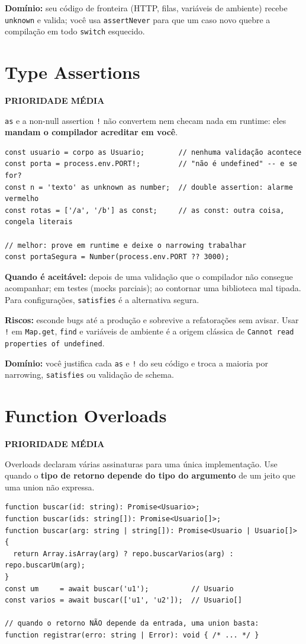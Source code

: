 \documentclass[12pt,a4paper,oneside]{book}
\newcommand{\media}{\colorbox{orange!20}{\sffamily\scriptsize\bfseries PRIORIDADE MÉDIA}}
\newcommand{\code}[1]{\texttt{#1}}
\newcommand{\dom}[1]{\begin{dominio}\textbf{Domínio:} #1\end{dominio}}
\begin{document}
\dom{seu código de fronteira (HTTP, filas, variáveis de ambiente) recebe \code{unknown} e valida; você usa \code{assertNever} para que um caso novo quebre a compilação em todo \code{switch} esquecido.}

\section{Type Assertions}
\label{sec:assertions}
\media

\code{as} e a non-null assertion \code{!} não convertem nem checam nada em runtime: eles \textbf{mandam o compilador acreditar em você}.

\begin{verbatim}
const usuario = corpo as Usuario;        // nenhuma validação acontece
const porta = process.env.PORT!;         // "não é undefined" -- e se for?
const n = 'texto' as unknown as number;  // double assertion: alarme vermelho
const rotas = ['/a', '/b'] as const;     // as const: outra coisa, congela literais

// melhor: prove em runtime e deixe o narrowing trabalhar
const portaSegura = Number(process.env.PORT ?? 3000);
\end{verbatim}

\textbf{Quando é aceitável:} depois de uma validação que o compilador não consegue acompanhar; em testes (mocks parciais); ao contornar uma biblioteca mal tipada. Para configurações, \code{satisfies} é a alternativa segura.

\textbf{Riscos:} esconde bugs até a produção e sobrevive a refatorações sem avisar. Usar \code{!} em \code{Map.get}, \code{find} e variáveis de ambiente é a origem clássica de \code{Cannot read properties of undefined}.

\dom{você justifica cada \code{as} e \code{!} do seu código e troca a maioria por narrowing, \code{satisfies} ou validação de schema.}

\section{Function Overloads}
\label{sec:overloads}
\media

Overloads declaram várias assinaturas para uma única implementação. Use quando o \textbf{tipo de retorno depende do tipo do argumento} de um jeito que uma union não expressa.

\begin{verbatim}
function buscar(id: string): Promise<Usuario>;
function buscar(ids: string[]): Promise<Usuario[]>;
function buscar(arg: string | string[]): Promise<Usuario | Usuario[]> {
  return Array.isArray(arg) ? repo.buscarVarios(arg) : repo.buscarUm(arg);
}
const um     = await buscar('u1');          // Usuario
const varios = await buscar(['u1', 'u2']);  // Usuario[]

// quando o retorno NÃO depende da entrada, uma union basta:
function registrar(erro: string | Error): void { /* ... */ }
\end{verbatim}
\end{document}
